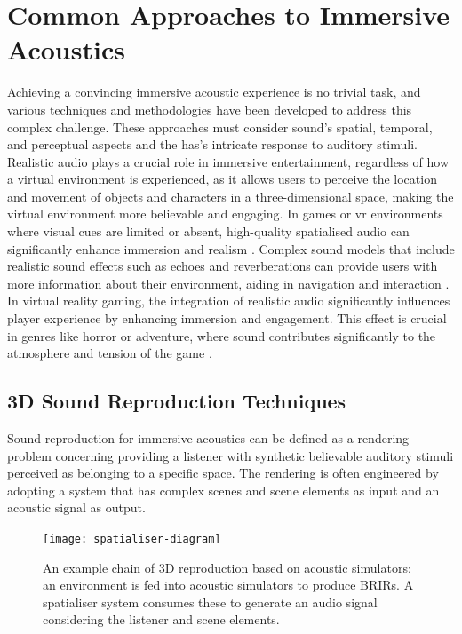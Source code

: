 \section{Common Approaches to Immersive Acoustics}\label{sec:intro-immersive-acoustics}
Achieving a convincing immersive acoustic experience is no trivial task, and various techniques and methodologies have been developed to address this complex challenge. These approaches must consider sound's spatial, temporal, and perceptual aspects and the \acrshort{has}'s intricate response to auditory stimuli. Realistic audio plays a crucial role in immersive entertainment, regardless of how a virtual environment is experienced, as it allows users to perceive the location and movement of objects and characters in a three-dimensional space, making the virtual environment more believable and engaging. 
In games or \acrshort{vr} environments where visual cues are limited or absent, high-quality spatialised audio can significantly enhance immersion and realism \citep{rubio2017immersive}. Complex sound models that include realistic sound effects such as echoes and reverberations can provide users with more information about their environment, aiding in navigation and interaction \citep{lokki2005navigation}. In virtual reality gaming, the integration of realistic audio significantly influences player experience by enhancing immersion and engagement. This effect is crucial in genres like horror or adventure, where sound contributes significantly to the atmosphere and tension of the game \citep{poeschl13}.

\subsection{3D Sound Reproduction Techniques}
Sound reproduction for immersive acoustics can be defined as a rendering problem concerning providing a listener with synthetic believable auditory stimuli perceived as belonging to a specific space. The rendering is often engineered by adopting a system that has complex scenes and scene elements as input and an acoustic signal as output. 
\begin{figure}
    \centering
    \texttt{[image: spatialiser-diagram]}
    \caption[Basic spatialisation chain]{An example chain of 3D reproduction based on acoustic simulators: an environment is fed into acoustic simulators to produce BRIRs. A spatialiser system consumes these to generate an audio signal considering the listener and scene elements.}
    \label{fig:spatialiser-overview}
\end{figure}

